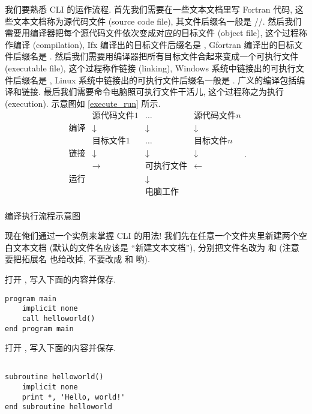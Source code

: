 我们要熟悉 CLI 的运作流程. 首先我们需要在一些文本文档里写 Fortran 代码, 这些文本文档称为源代码文件 (source code file), 其文件后缀名一般是 //. 然后我们需要用编译器把每个源代码文件依次变成对应的目标文件 (object file), 这个过程称作编译 (compilation), Ifx 编译出的目标文件后缀名是 , Gfortran 编译出的目标文件后缀名是 . 然后我们需要用编译器把所有目标文件合起来变成一个可执行文件 (executable file), 这个过程称作链接 (linking), Windows 系统中链接出的可执行文件后缀名是 , Linux 系统中链接出的可执行文件后缀名一般是 . 广义的编译包括编译和链接. 最后我们需要命令电脑照可执行文件干活儿, 这个过程称之为执行 (execution). 示意图如 \ref{execute_run} 所示.
\def\la{\leftarrow}
\def\ra{\rightarrow}
\def\da{\downarrow}
\begin{equation}
    \begin{matrix}
        & \text{源代码文件}1  & \dots & \text{源代码文件}n \\
        \text{编译} & \da  & \da & \da \\
        & \text{目标文件}1  & \dots & \text{目标文件}n \\
        \text{链接} & \da & \da & \da \\
        & \ra & \text{可执行文件} & \la \\
        \text{运行} & & \da &  \\
        & & \text{电脑工作} & \\
    \end{matrix}.\label{execute_run}
\end{equation}
\begin{center}
    编译执行流程示意图
\end{center}

现在俺们通过一个实例来掌握 CLI 的用法! 我们先在任意一个文件夹里新建两个空白文本文档 (默认的文件名应该是 ``\textsf{新建}\ttt{\ }\textsf{文本文档}''), 分别把文件名改为  和  (注意要把拓展名  也给改掉, 不要改成  和  哟).

打开 , 写入下面的内容并保存.
\begin{lstlisting}
program main
    implicit none
    call helloworld()
end program main
\end{lstlisting}

打开 , 写入下面的内容并保存.
\begin{lstlisting}

subroutine helloworld()
    implicit none
    print *, 'Hello, world!'
end subroutine helloworld
\end{lstlisting}

